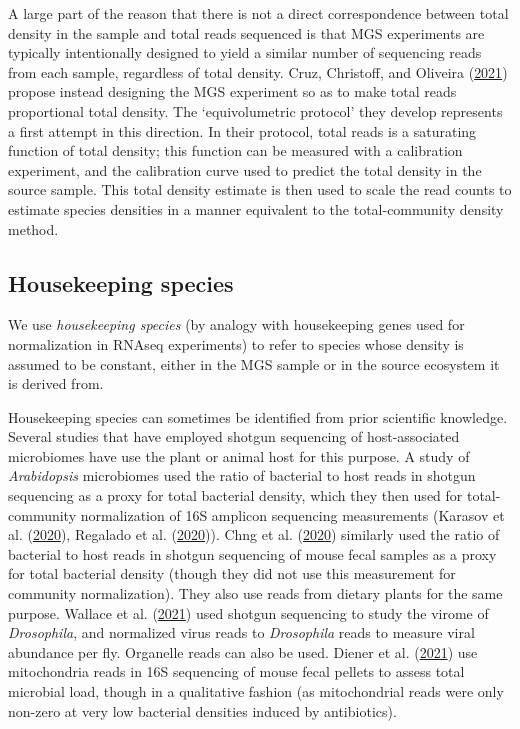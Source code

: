 \documentclass[
]{article}
\begin{document}
A large part of the reason that there is not a direct correspondence between total density in the sample and total reads sequenced is that MGS experiments are typically intentionally designed to yield a similar number of sequencing reads from each sample, regardless of total density.
Cruz, Christoff, and Oliveira (\protect\hyperlink{ref-cruz2021equi}{2021}) propose instead designing the MGS experiment so as to make total reads proportional total density.
The `equivolumetric protocol' they develop represents a first attempt in this direction.
In their protocol, total reads is a saturating function of total density; this function can be measured with a calibration experiment, and the calibration curve used to predict the total density in the source sample.
This total density estimate is then used to scale the read counts to estimate species densities in a manner equivalent to the total-community density method.

\hypertarget{housekeeping-species}{%
\subsection{Housekeeping species}\label{housekeeping-species}}

We use \emph{housekeeping species} (by analogy with housekeeping genes used for normalization in RNAseq experiments) to refer to species whose density is assumed to be constant, either in the MGS sample or in the source ecosystem it is derived from.

Housekeeping species can sometimes be identified from prior scientific knowledge.
Several studies that have employed shotgun sequencing of host-associated microbiomes have use the plant or animal host for this purpose.
A study of \emph{Arabidopsis} microbiomes used the ratio of bacterial to host reads in shotgun sequencing as a proxy for total bacterial density, which they then used for total-community normalization of 16S amplicon sequencing measurements (Karasov et al. (\protect\hyperlink{ref-karasov2020ther}{2020}), Regalado et al. (\protect\hyperlink{ref-regalado2019comb}{2020})).
Chng et al. (\protect\hyperlink{ref-chng2020meta}{2020}) similarly used the ratio of bacterial to host reads in shotgun sequencing of mouse fecal samples as a proxy for total bacterial density (though they did not use this measurement for community normalization).
They also use reads from dietary plants for the same purpose.
Wallace et al. (\protect\hyperlink{ref-wallace2021thed}{2021}) used shotgun sequencing to study the virome of \emph{Drosophila}, and normalized virus reads to \emph{Drosophila} reads to measure viral abundance per fly.
Organelle reads can also be used.
Diener et al. (\protect\hyperlink{ref-diener2021nonr}{2021}) use mitochondria reads in 16S sequencing of mouse fecal pellets to assess total microbial load, though in a qualitative fashion (as mitochondrial reads were only non-zero at very low bacterial densities induced by antibiotics).
\end{document}
